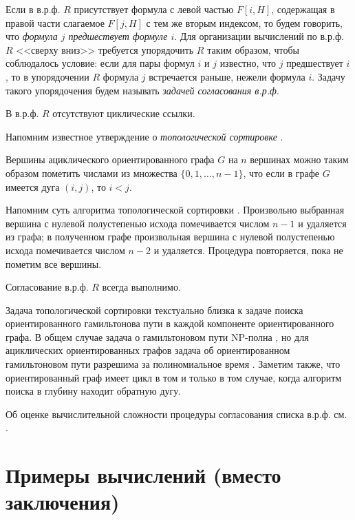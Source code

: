 Если в в.р.ф. $R$ присутствует формула с левой частью $F[i,H]$, содержащая в правой части слагаемое $F[j,H]$ с тем же вторым индексом, то будем говорить, что \textit{ формула $j$ предшествует формуле $i$}. Для организации вычислений по в.р.ф. $R$ <<сверху вниз>> требуется упорядочить $R$ таким образом, чтобы соблюдалось условие: если для пары формул $i$ и $j$ известно, что $j$ предшествует $i$, то в упорядочении $R$ формула $j$ встречается раньше, нежели формула $i$. Задачу такого упорядочения будем называть \textit{ задачей согласования в.р.ф}.

\label{the6}
В в.р.ф. $R$ отсутствуют циклические ссылки.


Напомним известное утверждение о \textit{ топологической сортировке}
\cite{13}.

\label{the7}
Вершины ациклического ориентированного графа $G$ на $n$ вершинах можно таким образом пометить числами из множества $\{0, 1, \dots, n-1\}$, что если в графе $G$ имеется дуга $(i,j)$, то $i<j$.


Напомним суть алгоритма топологической сортировки \cite{13}. Произвольно выбранная вершина с нулевой полустепенью исхода помечивается числом $n-1$ и удаляется из графа; в полученном графе произвольная вершина с нулевой полустепенью исхода помечивается числом $n-2$ и удаляется. Процедура повторяется, пока не пометим все вершины.

\label{the8}
Согласование в.р.ф. $R$ всегда выполнимо.


\begin{remark} Задача топологической сортировки текстуально близка к задаче поиска ориентированного гамильтонова пути в каждой компоненте ориентированного графа. В общем случае задача о гамильтоновом пути NP-полна \cite{14}, но для ациклических ориентированных графов задача об ориентированном гамильтоновом пути разрешима за полиномиальное время
\cite{15}. Заметим также, что ориентированный граф имеет цикл в том и только в том случае, когда алгоритм поиска в глубину \cite{16} находит обратную дугу.

Об оценке вычислительной сложности процедуры согласования списка в.р.ф. см. \cite{17}.
\end{remark}






\section{Примеры вычислений (вместо заключения)}

